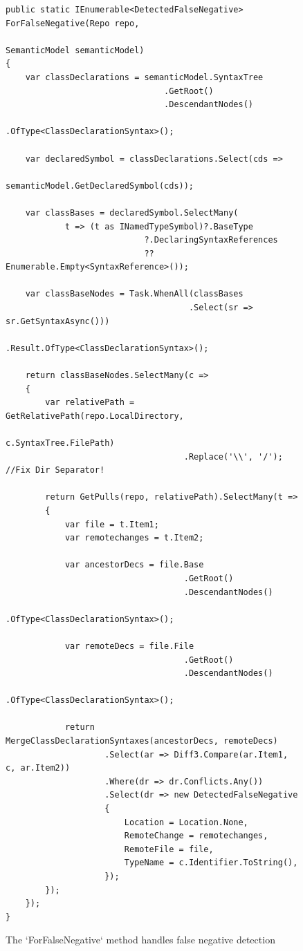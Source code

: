 \documentclass[draftclsnofoot,onecolumn]{IEEEtran}
\begin{document}
\begin{figure}[!t]
\centering
\begin{lstlisting}
public static IEnumerable<DetectedFalseNegative> ForFalseNegative(Repo repo,
                                                   SemanticModel semanticModel)
{
    var classDeclarations = semanticModel.SyntaxTree
                                .GetRoot()
                                .DescendantNodes()
                                .OfType<ClassDeclarationSyntax>();

    var declaredSymbol = classDeclarations.Select(cds => 
	                                     semanticModel.GetDeclaredSymbol(cds));

    var classBases = declaredSymbol.SelectMany(
            t => (t as INamedTypeSymbol)?.BaseType
                            ?.DeclaringSyntaxReferences 
							?? Enumerable.Empty<SyntaxReference>());

    var classBaseNodes = Task.WhenAll(classBases
	                                 .Select(sr => sr.GetSyntaxAsync()))
                           .Result.OfType<ClassDeclarationSyntax>();

    return classBaseNodes.SelectMany(c =>
    {
        var relativePath = GetRelativePath(repo.LocalDirectory, 
		                                                 c.SyntaxTree.FilePath)
                                    .Replace('\\', '/'); //Fix Dir Separator!

        return GetPulls(repo, relativePath).SelectMany(t =>
        {
            var file = t.Item1;
            var remotechanges = t.Item2;

            var ancestorDecs = file.Base
                                    .GetRoot()
                                    .DescendantNodes()
                                    .OfType<ClassDeclarationSyntax>();

            var remoteDecs = file.File
                                    .GetRoot()
                                    .DescendantNodes()
                                    .OfType<ClassDeclarationSyntax>();

            return MergeClassDeclarationSyntaxes(ancestorDecs, remoteDecs)
                    .Select(ar => Diff3.Compare(ar.Item1, c, ar.Item2))
                    .Where(dr => dr.Conflicts.Any())
                    .Select(dr => new DetectedFalseNegative
                    {
                        Location = Location.None,
                        RemoteChange = remotechanges,
                        RemoteFile = file,
                        TypeName = c.Identifier.ToString(),
                    });
        });
    });
}
\end{lstlisting}
\caption{The `ForFalseNegative` method handles false negative detection}
\label{anforfn}
\end{figure}
\end{document}
